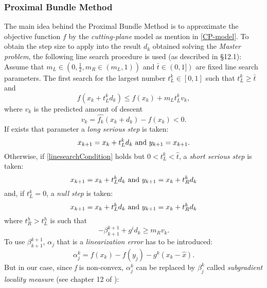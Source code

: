 \subsubsection{Proximal Bundle Method}
The main idea behind the Proximal Bundle Method is to approximate the objective function $f$ by the \textit{cutting-plane} model as mention in \ref{CP-model}. To obtain the step size to apply into the result $d_{k}$ obtained solving the \textit{Master problem}, the following line search procedure is used (as described in \cite{NonsmoothOPT} \S12.1): 
Assume that $m_{L} \in (0, \frac{1}{2}, m_{R} \in (m_{L},1))$ \textnormal{ and } $ \bar{t} \in (0,1])$ are fixed line search parameters. The first search for the largest number $t_{L}^k \in [0,1]$ such that $t_{L}^k \geq \bar{t}$ and
\begin{equation}
\label{linesearchCondition}
f(x_{k}+t_{L}^k d_{k}) \leq f(x_{k}) + m_{L}t_{L}^k v_{k}, 
\end{equation}
where $v_{k}$ is the predicted amount of descent 
\begin{equation}
v_{k} = \hat{f_{k}}(x_{k}+d_{k}) - f(x_{k}) < 0.
\end{equation}
If exists that parameter a \textit{long serious step} is taken:
\begin{equation}
x_{k+1} = x_{k} + t_{L}^k d_{k} \textnormal{ and } y_{k+1}= x_{k+1}.
\end{equation}
Otherwise, if \ref{linesearchCondition} holds but $0 < t_{L}^k < \hat{t}$, a \textit{short serious step} is taken:
\begin{equation}
x_{k+1} = x_{k} + t_{L}^k d_{k} \textnormal{ and } y_{k+1}= x_{k}+t_{R}^k d_{k}
\end{equation} 
and, if $t_ {L}^k=0$, a \textit{null step} is taken: 
\begin{equation}
x_{k+1} = x_{k} + t_{L}^k d_{k} \textnormal{ and } y_{k+1}= x_{k}+t_{R}^k  d_{k}
\end{equation}
where $t_{R}^h > t_{L}^h$ is such that 
\begin{equation}
- \beta_{k+1}^{k+1}+ g^i d_{k} \geq m_{R}v_{k}.
\end{equation}
To use  $ \beta_{k+1}^{k+1}$, $\alpha_{j}$ that is a \textit{linearization error} has to be introduced: 
\begin{equation}
\alpha_{j}^k = f(x_{k}) - f(y_{j}) -g^k(x_{k}-\hat{x}).
\end{equation}
But in our case, since \textit{f} is non-convex, $\alpha_{j}^k$ can be replaced by $\beta_{j}^k$ called \textit{subgradient locality measure} (see chapter 12 of \cite{NonsmoothOPT}): 
